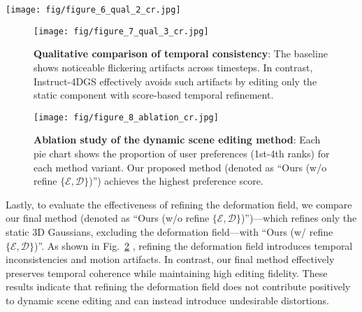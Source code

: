 \begin{figure*}[h]
\centering
    \texttt{[image: fig/figure\_6\_qual\_2\_cr.jpg]}
    \vspace{-7mm}
    \caption{\textbf{Qualitative comparison of visual quality}: We compare our method with the baseline~\cite{ref_9_i4d24d} on DyNeRF~\cite{ref_37_neural3dvideo} \emph{coffee\_martini} and \emph{sear\_steak} scenes, as well as Technicolor~\cite{ref_71_technicolor}'s \emph{Painter} and \emph{Train} scenes. See supplementary for more results.}
    \label{fig:qual_2}
\vspace{-4mm}
\end{figure*}


\begin{figure}[!t]
\centering
    \texttt{[image: fig/figure\_7\_qual\_3\_cr.jpg]}
    \vspace{-7mm}
    \caption{\textbf{Qualitative comparison of temporal consistency}: The baseline shows noticeable flickering artifacts across timesteps. In contrast, Instruct-4DGS effectively avoids such artifacts by editing only the static component with score-based temporal refinement.}
    \label{fig:qual_3}
\vspace{-4mm}
\end{figure}


\begin{figure}[!t]
\centering
    \texttt{[image: fig/figure\_8\_ablation\_cr.jpg]}
    \vspace{-6mm}
    \caption{\textbf{Ablation study of the dynamic scene editing method}: Each pie chart shows the proportion of user preferences (1st-4th ranks) for each method variant. Our proposed method (denoted as ``Ours (w/o refine $\{\mathcal{E}, \mathcal{D}\}$)'') achieves the highest preference score.
    }
    \label{fig:ablation}
\end{figure}

Lastly, to evaluate the effectiveness of refining the deformation field, we compare our final method (denoted as ``Ours (w/o refine $\{\mathcal{E}, \mathcal{D}\}$)'')---which refines only the static 3D Gaussians, excluding the deformation field---with ``Ours (w/ refine $\{\mathcal{E}, \mathcal{D}\}$)''. As shown in Fig.~\ref{fig:ablation} , refining the deformation field introduces temporal inconsistencies and motion artifacts. In contrast, our final method effectively preserves temporal coherence while maintaining high editing fidelity. These results indicate that refining the deformation field does not contribute positively to dynamic scene editing and can instead introduce undesirable distortions.